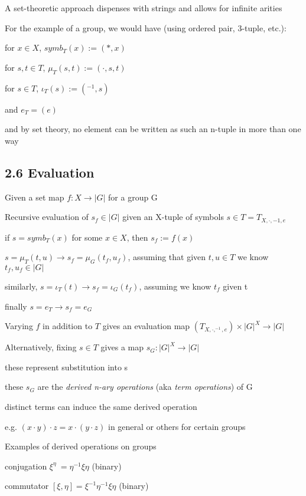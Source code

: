 \documentclass[12pt]{article}
\begin{document}
\noindent
A set-theoretic approach dispenses with strings and allows for infinite arities

\noindent
For the example of a group, we would have (using ordered pair, 3-tuple, etc.):

for $x \in X$, $symb_T(x) := (*, x)$

for $s, t \in T$, $\mu_T(s, t) := (\cdot, s, t)$

for $s \in T$, $\iota_T(s) := (^{-1}, s)$

and $e_T = (e)$

and by set theory, no element can be written as such an n-tuple in more than one way

\subsection{2.6 Evaluation}

\noindent
Given a set map $f: X \to |G|$ for a group G

\noindent
Recursive evaluation of $s_f \in |G|$ given an X-tuple of symbols $s \in T = T_{X, \cdot, -1, e}$

if $s= symb_T(x)$ for some $x \in X$, then $s_f := f(x)$

$s = \mu_T(t, u) \to s_f = \mu_G(t_f, u_f)$, assuming that given $t, u \in T$ we know $t_f, u_f \in |G|$

similarly, $s = \iota_T(t) \to s_f = \iota_G(t_f)$, assuming we know $t_f$ given t

finally $s = e_T \to s_f = e_G$

\noindent
Varying $f$ in addition to $T$ gives an evaluation map $(T_{X, \cdot, ^{-1}, e}) \times |G|^X \to |G|$

\noindent
Alternatively, fixing $s \in T$ gives a map $s_G: |G|^X \to |G|$

these represent substitution into s

these $s_G$ are the \textit{derived n-ary operations} (aka \textit{term operations}) of G

distinct terms can induce the same derived operation

e.g. $(x \cdot y) \cdot z = x \cdot (y \cdot z)$ in general or others for certain groups

\noindent
Examples of derived operations on groups

conjugation $\xi^{\eta}\ = \eta^{-1}\xi\eta$ (binary)

commutator $[\xi, \eta] = \xi^{-1}\eta^{-1}\xi\eta$ (binary)
\end{document}
